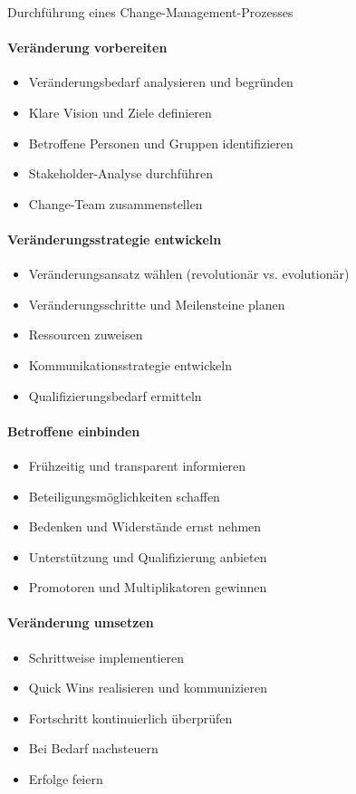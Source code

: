 \begin{KR}{Durchführung eines Change-Management-Prozesses}\\
\paragraph{Veränderung vorbereiten}
\begin{itemize}
    \item Veränderungsbedarf analysieren und begründen
    \item Klare Vision und Ziele definieren
    \item Betroffene Personen und Gruppen identifizieren
    \item Stakeholder-Analyse durchführen
    \item Change-Team zusammenstellen
\end{itemize}

\paragraph{Veränderungsstrategie entwickeln}
\begin{itemize}
    \item Veränderungsansatz wählen (revolutionär vs. evolutionär)
    \item Veränderungsschritte und Meilensteine planen
    \item Ressourcen zuweisen
    \item Kommunikationsstrategie entwickeln
    \item Qualifizierungsbedarf ermitteln
\end{itemize}

\paragraph{Betroffene einbinden}
\begin{itemize}
    \item Frühzeitig und transparent informieren
    \item Beteiligungsmöglichkeiten schaffen
    \item Bedenken und Widerstände ernst nehmen
    \item Unterstützung und Qualifizierung anbieten
    \item Promotoren und Multiplikatoren gewinnen
\end{itemize}

\paragraph{Veränderung umsetzen}
\begin{itemize}
    \item Schrittweise implementieren
    \item Quick Wins realisieren und kommunizieren
    \item Fortschritt kontinuierlich überprüfen
    \item Bei Bedarf nachsteuern
    \item Erfolge feiern
\end{itemize}


\end{KR}
